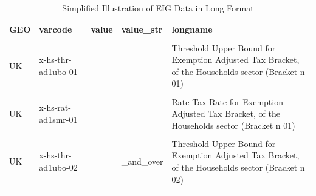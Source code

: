 \documentclass[
]{article}
\begin{document}
\begin{table}
\centering
\caption{\label{tab:eig_ex1l}Simplified Illustration of EIG Data in Long Format}
\centering
\begin{tabular}[t]{>{\raggedright\arraybackslash}p{0.53cm}>{\raggedright\arraybackslash}p{2.95cm}>{\raggedright\arraybackslash}p{1.55cm}>{\raggedright\arraybackslash}p{1.5cm}>{\raggedright\arraybackslash}p{8cm}}
\toprule
GEO & varcode & value & value\_str & longname\\
\midrule
\cellcolor{gray!10}{UK} & \cellcolor{gray!10}{x-hs-agg-totrev-00} & \cellcolor{gray!10}{5165000000} & \cellcolor{gray!10}{} & \cellcolor{gray!10}{Aggregate  Total Revenue, of the Households sector (Non-Bracket Specific)}\\
UK & x-hs-thr-ad1ubo-01 & 325000 &  & Threshold  Upper Bound for Exemption Adjusted Tax Bracket, of the Households sector (Bracket n 01)\\
\cellcolor{gray!10}{UK} & \cellcolor{gray!10}{x-hs-agg-ad1tlb-01} & \cellcolor{gray!10}{0} & \cellcolor{gray!10}{} & \cellcolor{gray!10}{Aggregate  Tax Paid on Lower Bound for Exemption Adjusted Tax Bracket, of the Households sector (Bracket n 01)}\\
UK & x-hs-rat-ad1smr-01 & 0 &  & Rate  Tax Rate for Exemption Adjusted Tax Bracket, of the Households sector (Bracket n 01)\\
\cellcolor{gray!10}{UK} & \cellcolor{gray!10}{x-hs-thr-ad1lbo-02} & \cellcolor{gray!10}{325000} & \cellcolor{gray!10}{} & \cellcolor{gray!10}{Threshold  Lower Bound for Exemption Adjusted Tax Bracket, of the Households sector (Bracket n 02)}\\
\addlinespace
UK & x-hs-thr-ad1ubo-02 &  & \_and\_over & Threshold  Upper Bound for Exemption Adjusted Tax Bracket, of the Households sector (Bracket n 02)\\
\cellcolor{gray!10}{UK} & \cellcolor{gray!10}{x-hs-rat-ad1smr-02} & \cellcolor{gray!10}{40} & \cellcolor{gray!10}{} & \cellcolor{gray!10}{Rate  Tax Rate for Exemption Adjusted Tax Bracket, of the Households sector (Bracket n 02)}\\
\bottomrule
\end{tabular}
\end{table}
\end{document}
